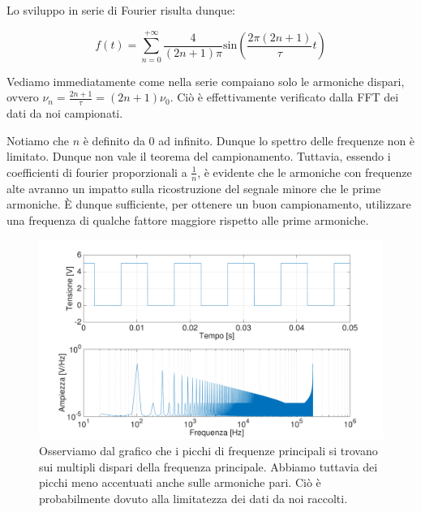 Lo sviluppo in serie di Fourier risulta dunque: 

\begin{equation}
f(t)=\sum_{n=0}^{+\infty}\frac{4}{(2n+1)\pi}\mathrm{sin} \left(\frac{2\pi(2n+1)}{\tau}t\right)
\end{equation}

Vediamo immediatamente come nella serie compaiano solo le armoniche dispari, ovvero $\nu_n=\frac{2n+1}{\tau}=(2n+1)\nu_0$. Ciò è effettivamente verificato dalla FFT dei dati da noi campionati.

Notiamo che $n$ è definito da 0 ad infinito. Dunque lo spettro delle frequenze non è limitato. Dunque non vale il teorema del campionamento. Tuttavia, essendo i coefficienti di fourier proporzionali a $\frac{1}{n}$, è evidente che le armoniche con frequenze alte avranno un impatto sulla ricostruzione del segnale minore che le prime armoniche. È dunque sufficiente, per ottenere un buon campionamento, utilizzare una frequenza di qualche fattore maggiore rispetto alle prime armoniche. 





\begin{figure}[H]
\centering
	\includegraphics[width=.63\textwidth]{../E13/latex/quadra100hz@10000,200000.pdf}
	\caption{Osserviamo dal grafico che i picchi di frequenze principali si trovano sui multipli dispari della frequenza principale. Abbiamo tuttavia dei picchi meno accentuati anche sulle armoniche pari. Ciò è probabilmente dovuto alla limitatezza dei dati da noi raccolti.}
	\label{quadra}
\end{figure}

